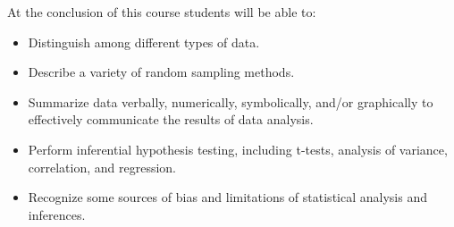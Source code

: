At the conclusion of this course students will be able to:

\begin{itemize}
	\item Distinguish among different types of data.
	\item Describe a variety of random sampling methods.	
	\item Summarize data verbally, numerically, symbolically, and/or graphically to effectively communicate the results of data analysis. 
	\item Perform inferential hypothesis testing, including t-tests, analysis of variance, correlation, and regression.
	\item Recognize some sources of bias and limitations of statistical analysis and inferences.





\end{itemize}